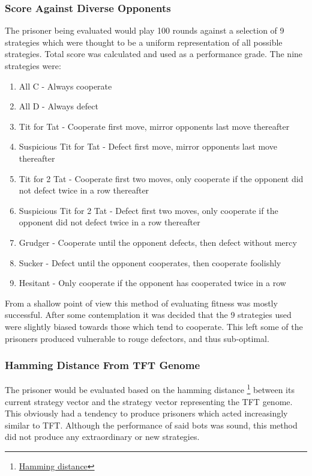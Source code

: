 \documentclass[12pt]{article}
\begin{document}
\subsubsection{Score Against Diverse Opponents}
The prisoner being evaluated would play 100 rounds against a selection of 9
strategies which were thought to be a uniform representation of all possible
strategies.  Total score was calculated and used as a performance grade.
The nine strategies were:
\begin{enumerate}
    \item All C - Always cooperate
    \item All D - Always defect
    \item Tit for Tat - Cooperate first move, mirror opponents last move thereafter
    \item Suspicious Tit for Tat - Defect first move, mirror opponents last move
        thereafter
    \item Tit for 2 Tat - Cooperate first two moves, only cooperate if the
        opponent did not defect twice in a row thereafter
    \item Suspicious Tit for 2 Tat - Defect first two moves, only cooperate if the
        opponent did not defect twice in a row thereafter
    \item Grudger - Cooperate until the opponent defects, then defect without mercy
    \item Sucker - Defect until the opponent cooperates, then cooperate foolishly
    \item Hesitant - Only cooperate if the opponent has cooperated twice in a row
\end{enumerate}

From a shallow point of view this method of evaluating fitness was mostly
successful.  After some contemplation it was decided that the
9 strategies used were slightly biased towards those which tend to cooperate.
This left some of the prisoners produced vulnerable to rouge defectors,
and thus sub-optimal.

\subsubsection{Hamming Distance From TFT Genome}
The prisoner would be evaluated based on the hamming distance
\footnote
{\href{https://en.wikipedia.org/wiki/Hamming distance}{Hamming distance}}
between its current strategy vector and the strategy vector representing
the TFT genome.  This obviously had a tendency to produce prisoners which
acted increasingly similar to TFT.  Although the performance of said bots
was sound, this method did not produce any extraordinary or new strategies.
\end{document}
